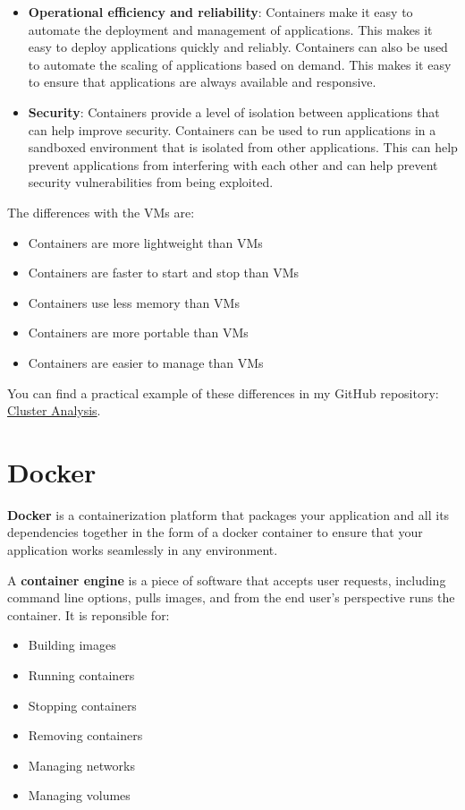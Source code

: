 \begin{itemize}
    \item \textbf{Operational efficiency and reliability}: Containers make it easy to automate the deployment and management of applications. This makes it easy to deploy applications quickly and reliably. Containers can also be used to automate the scaling of applications based on demand. This makes it easy to ensure that applications are always available and responsive.
    \item \textbf{Security}: Containers provide a level of isolation between applications that can help improve security. Containers can be used to run applications in a sandboxed environment that is isolated from other applications. This can help prevent applications from interfering with each other and can help prevent security vulnerabilities from being exploited.
\end{itemize}

The differences with the VMs are:
\begin{itemize}
    \item Containers are more lightweight than VMs
    \item Containers are faster to start and stop than VMs
    \item Containers use less memory than VMs
    \item Containers are more portable than VMs
    \item Containers are easier to manage than VMs
\end{itemize}

You can find a practical example of these differences in my GitHub repository: \href{https://github.com/christianfaccio/cluster_analysis.git}{Cluster Analysis}.

\section{Docker}

\textbf{Docker} is a containerization platform that packages your application and all its
dependencies together in the form of a docker container to ensure that your
application works seamlessly in any environment.

\begin{definitionblock}
    A \textbf{container engine} is a piece of software that accepts user requests,
    including command line options, pulls images, and from the end user's
    perspective runs the container. It is reponsible for:
    \begin{itemize}
        \item Building images
        \item Running containers
        \item Stopping containers
        \item Removing containers
        \item Managing networks
        \item Managing volumes
    \end{itemize}
\end{definitionblock}

